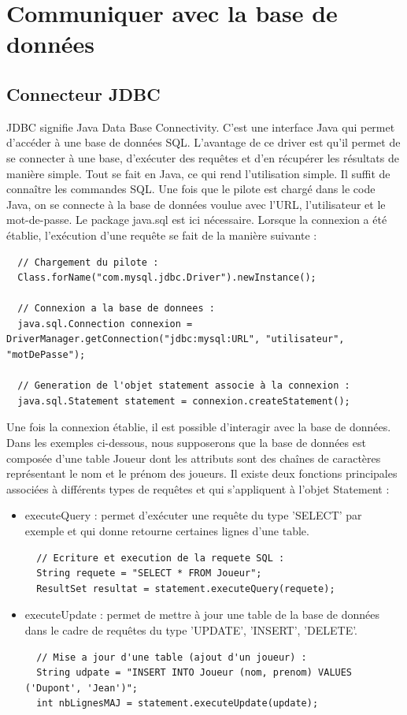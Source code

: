 \section{Communiquer avec la base de données}


\subsection{Connecteur JDBC}
JDBC signifie Java Data Base Connectivity. C'est une interface Java qui permet d'accéder à une base de données SQL.
L'avantage de ce driver est qu'il permet de se connecter à une base, d'exécuter des requêtes et d'en récupérer les résultats de manière simple.
Tout se fait en Java, ce qui rend l'utilisation simple. Il suffit de connaître les commandes SQL.
Une fois que le pilote est chargé dans le code Java, on se connecte à la base de données voulue avec l'URL, l'utilisateur et le mot-de-passe. Le package java.sql est ici nécessaire.
Lorsque la connexion a été établie, l'exécution d'une requête se fait de la manière suivante :

\begin{lstlisting}
  // Chargement du pilote :
  Class.forName("com.mysql.jdbc.Driver").newInstance();
  
  // Connexion a la base de donnees :
  java.sql.Connection connexion =  DriverManager.getConnection("jdbc:mysql:URL", "utilisateur", "motDePasse");
  
  // Generation de l'objet statement associe à la connexion :
  java.sql.Statement statement = connexion.createStatement();
\end{lstlisting}  
  
%
Une fois la connexion établie, il est possible d'interagir avec la base de données. Dans les exemples ci-dessous, nous supposerons que la base de données
est composée d'une table Joueur dont les attributs sont des chaînes de caractères représentant le nom et le prénom des joueurs. Il existe deux fonctions
principales associées à différents types de requêtes et qui s'appliquent à l'objet Statement :
\begin{itemize}
 \item executeQuery : permet d'exécuter une requête du type 'SELECT' par exemple et qui donne retourne certaines lignes d'une table.
  \begin{lstlisting}  
  // Ecriture et execution de la requete SQL :
  String requete = "SELECT * FROM Joueur";
  ResultSet resultat = statement.executeQuery(requete);
  \end{lstlisting}
 \item executeUpdate : permet de mettre à jour une table de la base de données dans le cadre de requêtes du type 'UPDATE', 'INSERT', 'DELETE'.
  \begin{lstlisting}
  // Mise a jour d'une table (ajout d'un joueur) :
  String udpate = "INSERT INTO Joueur (nom, prenom) VALUES ('Dupont', 'Jean')";
  int nbLignesMAJ = statement.executeUpdate(update);
  \end{lstlisting}
\end{itemize}

